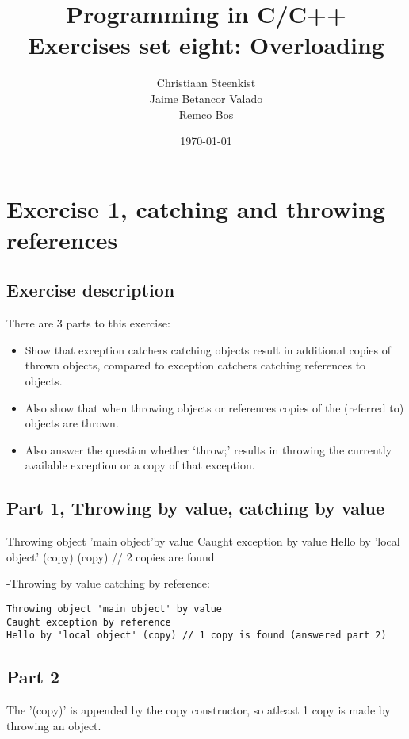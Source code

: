 \documentclass[11pt]{article}
\begin{document}
\title{Programming in C/C++ \\
       Exercises set eight: Overloading
}
\date{\today}
\author{Christiaan Steenkist \\
Jaime Betancor Valado \\
Remco Bos \\
}

\maketitle

\section*{Exercise 1, catching and throwing references}
\subsection*{Exercise description}
There are 3 parts to this exercise:
\begin{itemize}
\item Show that exception catchers catching objects result in additional copies of thrown objects, compared to exception catchers catching references to objects.
\item Also show that when throwing objects or references copies of the (referred to) objects are thrown.
\item Also answer the question whether `throw;' results in throwing the currently available exception or a copy of that exception. 
\end{itemize}

\subsection*{Part 1, Throwing by value, catching by value}
Throwing object 'main object'by value
Caught exception by value
Hello by 'local object' (copy)  (copy) // 2 copies are found

-Throwing by value catching by reference:
\begin{lstlisting}
Throwing object 'main object' by value
Caught exception by reference
Hello by 'local object' (copy) // 1 copy is found (answered part 2)
\end{lstlisting}

\subsection*{Part 2}
The '(copy)' is appended by the copy constructor, so atleast 1 copy is made
by throwing an object.
\end{document}
